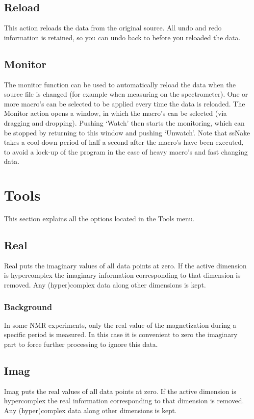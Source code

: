 \documentclass[11pt,a4paper]{article}
\begin{document}
\subsection{Reload}
This action reloads the data from the original source. All undo and redo information is retained, so you can undo back to before you reloaded the data. 

\subsection{Monitor}
The monitor function can be used to automatically reload the data when the source file is changed (for example when measuring on the spectrometer). One or more macro's can be selected to be applied every time the data is reloaded. The Monitor action opens a window, in which the macro's can be selected (via dragging and dropping). Pushing `Watch' then starts the monitoring, which can be stopped by returning to this window and pushing `Unwatch'. Note that ssNake takes a cool-down period of half a second after the macro's have been executed, to avoid a lock-up of the program in the case of heavy macro's and fast changing data.


\section{Tools}
This section explains all the options located in the Tools menu.

\subsection{Real}
Real puts the imaginary values of all data points at zero. If the active dimension is hypercomplex the imaginary information corresponding to that dimension is removed. Any (hyper)complex data along other dimensions is kept.

\subsubsection*{Background}
In some NMR experiments, only the real value of the magnetization during a specific period is measured. In this case it is convenient to zero the imaginary part to force further processing to ignore this data.

\subsection{Imag}
Imag puts the real values of all data points at zero. If the active dimension is hypercomplex the real information corresponding to that dimension is removed. Any (hyper)complex data along other dimensions is kept.
\end{document}
